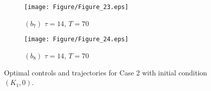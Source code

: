 \documentclass[10pt,letterpaper]{article}
\begin{document}
\begin{figure}[H]
    \begin{subfigure}[t]{0.48\textwidth}
        \centering
        \texttt{[image: Figure/Figure\_23.eps]}
        \par \vspace{1pt} $(b_7)$ $\tau = 14$, $T = 70$
    \end{subfigure}
    \hfill
    \begin{subfigure}[t]{0.48\textwidth}
        \centering
        \texttt{[image: Figure/Figure\_24.eps]}
        \par \vspace{1pt} $(b_8)$ $\tau = 14$, $T = 70$
    \end{subfigure}

    \hspace{1pt}\caption{Optimal controls and trajectories for Case 2 with initial condition $(K_1,0)$.}
    \label{fig:6}
\end{figure}
\end{document}
